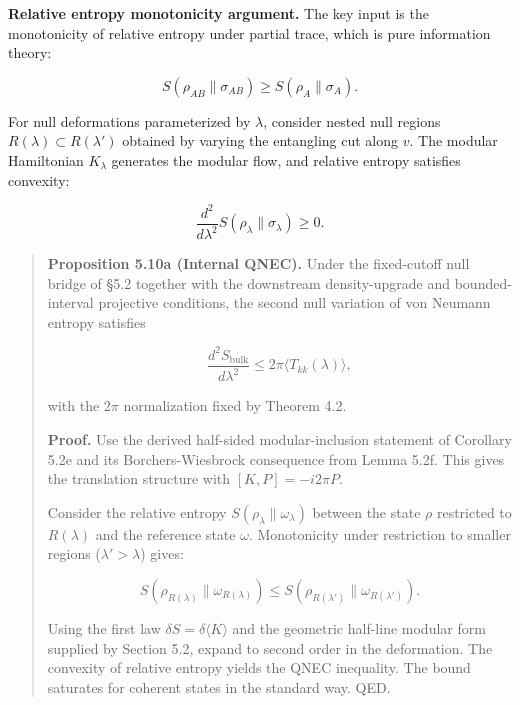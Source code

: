 \textbf{Relative entropy monotonicity argument.} The key input is the monotonicity of relative entropy under partial trace, which is pure information theory:

\[
S(\rho_{AB} \| \sigma_{AB}) \ge S(\rho_A \| \sigma_A).
\]

For null deformations parameterized by \(\lambda\), consider nested null regions \(R(\lambda) \subset R(\lambda')\) obtained by varying the entangling cut along \(v\). The modular Hamiltonian \(K_\lambda\) generates the modular flow, and relative entropy satisfies convexity:

\[
\frac{d^2}{d\lambda^2} S(\rho_\lambda \| \sigma_\lambda) \ge 0.
\]

\begin{quote}
\textbf{Proposition 5.10a (Internal QNEC).} Under the fixed-cutoff null bridge of \S{}5.2 together with the downstream density-upgrade and bounded-interval projective conditions, the second null variation of von Neumann entropy satisfies

\[
\frac{d^2 S_{\mathrm{bulk}}}{d\lambda^2} \le 2\pi \langle T_{kk}(\lambda) \rangle,
\]

with the \(2\pi\) normalization fixed by Theorem 4.2.

\textbf{Proof.} Use the derived half-sided modular-inclusion statement of Corollary 5.2e and its Borchers-Wiesbrock consequence from Lemma 5.2f. This gives the translation structure with \([K, P] = - i 2\pi P\).

Consider the relative entropy \(S(\rho_\lambda \| \omega_\lambda)\) between the state \(\rho\) restricted to \(R(\lambda)\) and the reference state \(\omega\). Monotonicity under restriction to smaller regions (\(\lambda' > \lambda\)) gives:

\[
S(\rho_{R(\lambda)} \| \omega_{R(\lambda)}) \le S(\rho_{R(\lambda')} \| \omega_{R(\lambda')}).
\]

Using the first law \(\delta S = \delta \langle K \rangle\) and the geometric half-line modular form supplied by Section 5.2, expand to second order in the deformation. The convexity of relative entropy yields the QNEC inequality. The bound saturates for coherent states in the standard way. QED.
\end{quote}

